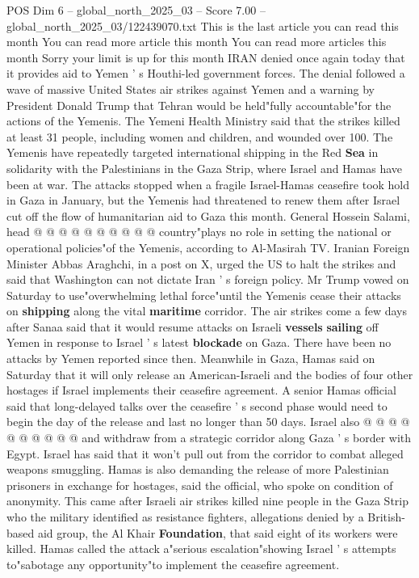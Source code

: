 \begin{textsample}{POS Dim 6 – global\_north\_2025\_03 – Score 7.00 – global\_north\_2025\_03/122439070.txt}  \label{ex:f6_pos_222}
This is the last article you can read this month You can read more article this month You can read more articles this month Sorry your limit is up for this month IRAN denied once again today that it provides aid to Yemen ' s Houthi-led government forces.
The denial followed a wave of massive United States air strikes against Yemen and a warning by President Donald Trump that Tehran would be held"fully accountable"for the actions of the Yemenis.
The Yemeni Health Ministry said that the strikes killed at least 31 people, including women and children, and wounded over 100.
The Yemenis have repeatedly targeted international shipping in the Red \textbf{Sea} in solidarity with the Palestinians in the Gaza Strip, where Israel and Hamas have been at war.
The attacks stopped when a fragile Israel-Hamas ceasefire took hold in Gaza in January, but the Yemenis had threatened to renew them after Israel cut off the flow of humanitarian aid to Gaza this month.
General Hossein Salami, head @ @ @ @ @ @ @ @ @ @ country"plays no role in setting the national or operational policies"of the Yemenis, according to Al-Masirah TV.
Iranian Foreign Minister Abbas Araghchi, in a post on X, urged the US to halt the strikes and said that Washington can not dictate Iran ' s foreign policy.
Mr Trump vowed on Saturday to use"overwhelming lethal force"until the Yemenis cease their attacks on \textbf{shipping} along the vital \textbf{maritime} corridor.
The air strikes come a few days after Sanaa said that it would resume attacks on Israeli \textbf{vessels} \textbf{sailing} off Yemen in response to Israel ' s latest \textbf{blockade} on Gaza.
There have been no attacks by Yemen reported since then.
Meanwhile in Gaza, Hamas said on Saturday that it will only release an American-Israeli and the bodies of four other hostages if Israel implements their ceasefire agreement.
A senior Hamas official said that long-delayed talks over the ceasefire ' s second phase would need to begin the day of the release and last no longer than 50 days.
Israel also @ @ @ @ @ @ @ @ @ @ and withdraw from a strategic corridor along Gaza ' s border with Egypt.
Israel has said that it won't pull out from the corridor to combat alleged weapons smuggling.
Hamas is also demanding the release of more Palestinian prisoners in exchange for hostages, said the official, who spoke on condition of anonymity.
This came after Israeli air strikes killed nine people in the Gaza Strip who the military identified as resistance fighters, allegations denied by a British-based aid group, the Al Khair \textbf{Foundation}, that said eight of its workers were killed.
Hamas called the attack a"serious escalation"showing Israel ' s attempts to"sabotage any opportunity"to implement the ceasefire agreement.

\end{textsample}
